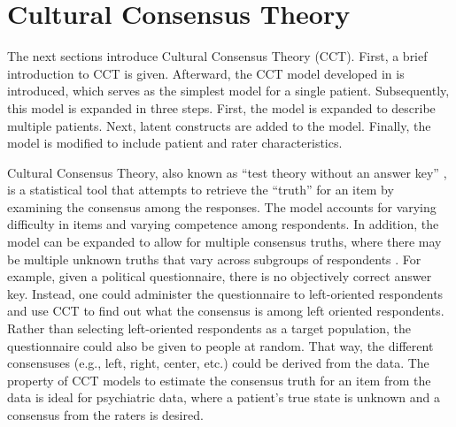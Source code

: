 \documentclass{article}
\begin{document}
\section*{Cultural Consensus Theory}
The next sections introduce Cultural Consensus Theory (CCT). First, a brief introduction to CCT is given. Afterward, the CCT model developed in \cite{Anders2015cultural} is introduced, which serves as the simplest model for a single patient. Subsequently, this model is expanded in three steps. First, the model is expanded to describe multiple patients. Next, latent constructs are added to the model. Finally, the model is modified to include patient and rater characteristics.

Cultural Consensus Theory, also known as ``test theory without an answer key'' \cite{batchelder1988test}, is a statistical tool that attempts to retrieve the ``truth'' for an item by examining the consensus among the responses. The model accounts for varying difficulty in items and varying competence among respondents. In addition, the model can be expanded to allow for multiple consensus truths, where there may be multiple unknown truths that vary across subgroups of respondents \cite{AndersBatchelder2012}. For example, given a political questionnaire, there is no objectively correct answer key. Instead, one could administer the questionnaire to left-oriented respondents and use CCT to find out what the consensus is among left oriented respondents. Rather than selecting left-oriented respondents as a target population, the questionnaire could also be given to people at random. That way, the different consensuses (e.g., left, right, center, etc.) could be derived from the data. The property of CCT models to estimate the consensus truth for an item from the data is ideal for psychiatric data, where a patient's true state is unknown and a consensus from the raters is desired.
\end{document}
